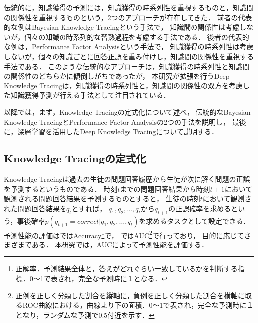 伝統的に，知識獲得の予測には，知識獲得の時系列性を重視するものと，知識間の関係性を重視するものという，2つのアプローチが存在してきた．
前者の代表的な例はBayesian Knowledge Tracing\cite{corbett1994knowledge}という手法で，
知識間の関係性は考慮しないが，個々の知識の時系列的な習熟過程を考慮する手法である．
後者の代表的な例は，Performance Factor Analysis\cite{pavlik2009performance}という手法で，
知識獲得の時系列性は考慮しないが，個々の知識ごとに回答正誤を重み付けし，知識間の関係性を重視する手法である．
このような伝統的なアプローチは，知識獲得の時系列性と知識間の関係性のどちらかに傾倒しがちであったが，
本研究が拡張を行うDeep Knowledge Tracing\cite{piech2015deep}は，知識獲得の時系列性と，知識間の関係性の双方を考慮した知識獲得予測が行える手法として注目されている．


以降では，まず，Knowledge Tracingの定式化について述べ，
伝統的なBayesian Knowledge TracingとPerformance Factor Analysisの2つの手法を説明し，
最後に，深層学習を活用したDeep Knowledge Tracingについて説明する．


\subsection{Knowledge Tracingの定式化}
Knowledge Tracingは過去の生徒の問題回答履歴から生徒が次に解く問題の正誤を予測するというものである．
時刻$t$までの問題回答結果から時刻$t+1$において観測される問題回答結果を予測するものとすると，
生徒の時刻$t$において観測された問題回答結果を$q_{t}$とすれば，
$q_1, q_2, \dots, q_t$から$q_{t+1}$の正誤確率を求めるという，事後確率$p(q_{t+1} = correct|q_1, q_2, \dots, q_t)$を求めるタスクとして設定できる．
予測性能の評価は\cite{yudelson2013individualized, falakmasir2015spectral}ではAccuracy\footnote{正解率．予測結果全体と，答えがどれぐらい一致しているかを判断する指標．0〜1で表され，完全な予測時に１となる．}で，
\cite{piech2015deep}ではAUC\footnote{正例を正しく分類した割合を縦軸に，負例を正しく分類した割合を横軸に取るROC曲線における，曲線より下の面積．0〜1で表され，完全な予測時に１となり，ランダムな予測で0.5付近を示す．}で行っており，
目的に応じてさまざまである．
本研究では，AUCによって予測性能を評価する．


